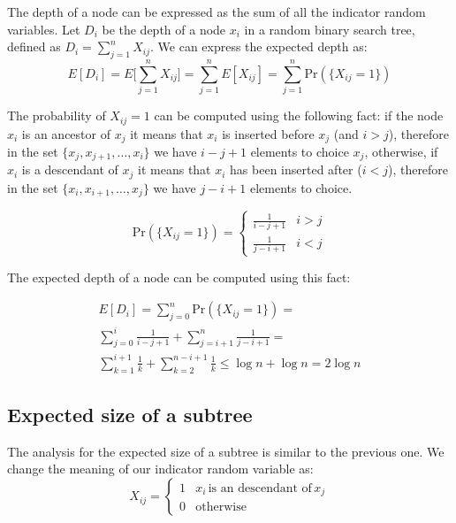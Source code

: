 \documentclass{article}
\begin{document}
\noindent The depth of a node can be expressed as the sum of all the indicator random variables. Let $D_i$ be the depth of a node $x_i$ in a random binary search tree, defined as $D_i = \sum_{j = 1}^{n} X_{ij}$. We can express the expected depth as:
\begin{equation}
E[D_i] = E\bigg[\sum_{j = 1}^{n} X_{ij}\bigg] = \sum_{j = 1}^{n} E[X_{ij}] = \sum_{j = 1}^{n} \textrm{Pr}(\{X_{ij} = 1\})
\end{equation}

\noindent The probability of $X_{ij} = 1$ can be computed using the following fact: if the node $x_i$ is an ancestor of $x_j$ it means that $x_i$ is inserted before $x_j$ (and $i > j$), therefore in the set $\{x_j, x_{j + 1}, \dots, x_{i}\}$ we have $i - j + 1$ elements to choice $x_j$, otherwise, if $x_i$ is a descendant of $x_j$ it means that $x_i$ has been inserted after ($i < j$), therefore in the set $\{x_{i}, x_{i + 1}, \dots, x_j\}$ we have $j - i +1$ elements to choice. 

\begin{equation}
    \textrm{Pr}(\{X_{ij} = 1\}) = \begin{cases}
        \frac{1}{i - j + 1} & i > j \\
        \frac{1}{j - i + 1} & i < j
    \end{cases}
\end{equation}

\noindent The expected depth of a node can be computed using this fact:

\begin{align*}
    E[D_i] = \sum_{j = 0}^{n} \textrm{Pr}(\{X_{ij} = 1\}) = \\ 
    \sum_{j = 0}^{i} \frac{1}{i - j + 1} + \sum_{j = i + 1}^{n} \frac{1}{j - i + 1} = \\
    \sum_{k = 1}^{i + 1} \frac{1}{k} + \sum_{k = 2}^{n - i + 1} \frac{1}{k} \le 
    \log{n} + \log{n} = 2 \log{n}
\end{align*}

\subsection{Expected size of a subtree}

The analysis for the expected size of a subtree is similar to the previous one. We change the meaning of our indicator random variable as:
\begin{equation}
    X_{ij} = \begin{cases}
    1 & x_i \, \textrm{is an descendant of} \, x_j\\
    0 & \textrm{otherwise}
    \end{cases}
\end{equation}
\end{document}
